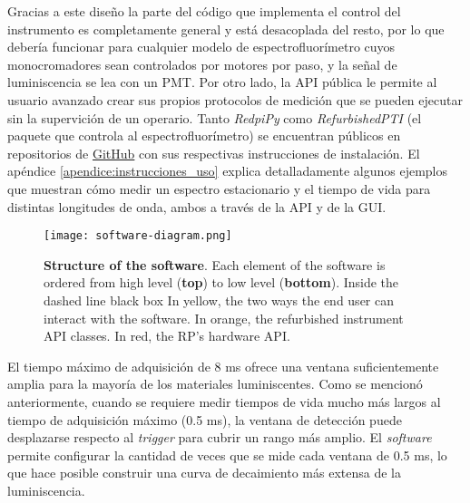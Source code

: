 Gracias a este diseño la parte del código que implementa el control del instrumento es completamente general y está desacoplada del resto, por lo que debería funcionar para cualquier modelo de espectrofluorímetro cuyos monocromadores sean controlados por motores por paso, y la señal de luminiscencia se lea con un PMT.
Por otro lado, la API pública le permite al usuario avanzado crear sus propios protocolos de medición que se pueden ejecutar sin la supervición de un operario.
Tanto \textit{RedpiPy} como \textit{RefurbishedPTI} (el paquete que controla al espectrofluorímetro) se encuentran públicos en repositorios de \href{https://github.com}{GitHub} con sus respectivas instrucciones de instalación. 
El apéndice \ref{apendice:instrucciones_uso} explica detalladamente algunos ejemplos que muestran cómo medir un espectro estacionario y el tiempo de vida para distintas longitudes de onda, ambos a través de la API y de la GUI.



\begin{figure}[h]
     \centering
     \caption{ \textbf{Structure of the software}. Each element of the software is ordered from high level (\textbf{top}) to low level (\textbf{bottom}). Inside the dashed line black box In yellow, the two ways the end user can interact with the software. In orange, the refurbished instrument API classes. In red, the RP's hardware API.}
     \texttt{[image: software-diagram.png]}
     \label{fig:code}
\end{figure}


El tiempo máximo de adquisición de 8 ms ofrece una ventana suficientemente amplia para la mayoría de los materiales luminiscentes. 
Como se mencionó anteriormente, cuando se requiere medir tiempos de vida mucho más largos al tiempo de adquisición máximo (0.5 ms), la ventana de detección puede desplazarse respecto al \textit{trigger} para cubrir un rango más amplio. 
El \textit{software} permite configurar la cantidad de veces que se mide cada ventana de 0.5 ms, lo que hace posible construir una curva de decaimiento más extensa de la luminiscencia.

